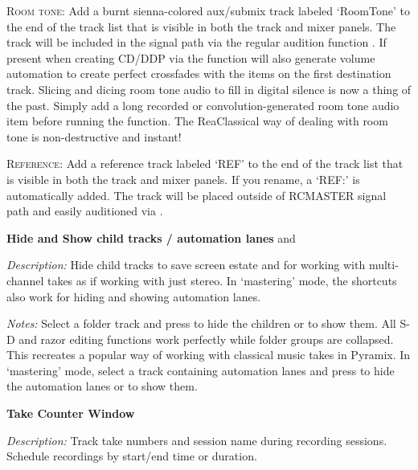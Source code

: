 \documentclass[10pt,american]{article}
\begin{document}
\textsc{Room tone}: Add a burnt sienna-colored aux/submix track labeled
`RoomTone' to the end of the track list that is visible in both the track and
mixer panels. The track will be included in the signal path via the regular
audition function . If present when creating CD/DDP via the function
will also generate volume automation to create perfect crossfades with the items
on the first destination track. Slicing and dicing room tone audio to fill in
digital silence is now a thing of the past. Simply add a long recorded or
convolution-generated room tone audio item before running the function. The
ReaClassical way of dealing with room tone is non-destructive and instant! 

\textsc{Reference}: Add a reference track labeled `REF' to the end of the track
list that is visible in both the track and mixer panels. If you rename, a `REF:'
is automatically added. The track will be placed outside of RCMASTER signal path
and easily auditioned via . 

\textbf{Hide and Show child tracks / automation lanes } and

\emph{Description: }Hide child tracks to save screen estate and for working with
multi-channel takes as if working with just stereo. In `mastering' mode, the
shortcuts also work for hiding and showing automation lanes.

\emph{Notes: }Select a folder track and press  to hide the children or
 to show them. All S-D and razor editing functions work perfectly while
folder groups are collapsed. This recreates a popular way of working with
classical music takes in Pyramix. In `mastering' mode, select a track containing
automation lanes and press  to hide the automation lanes or  to
show them.

\textbf{Take Counter Window} \keys{\ctrl+\enter}

\emph{Description:} Track take numbers and session name during recording
sessions. Schedule recordings by start/end time or duration.
\end{document}
